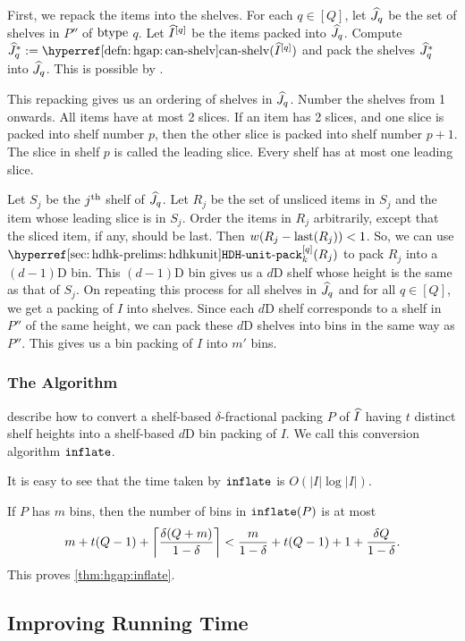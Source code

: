First, we repack the items into the shelves.
For each $q \in [Q]$, let $\widehat{J}_q$ be the set of shelves in $P''$ of $\operatorname{btype}$ $q$.
Let $\widehat{I}^{[q]}$ be the items packed into $\widehat{J}_q$.
Compute $\Jhat^*_q \defeq \canShelvHyp(\Ihat^{[q]})$ and pack the shelves
$\widehat{J}^*_q$ into $\widehat{J}_q$. This is possible by
.

This repacking gives us an ordering of shelves in $\widehat{J}_q$.
Number the shelves from 1 onwards.
All items have at most 2 slices. If an item has 2 slices, and one slice is packed
into shelf number $p$, then the other slice is packed into shelf number $p+1$.
The slice in shelf $p$ is called the leading slice.
Every shelf has at most one leading slice.

Let $S_j$ be the $j^{\textrm{th}}$ shelf of $\widehat{J}_q$.
Let $R_j$ be the set of unsliced items in $S_j$
and the item whose leading slice is in $S_j$.
Order the items in $R_j$ arbitrarily, except that the sliced item, if any, should be last.
Then $w(R_j - \operatorname{last}(R_j)) < 1$.
So, we can use $\hdhkunitHyp^{[q]}(R_j)$ to pack $R_j$ into a $(d-1)$D bin.
This $(d-1)$D bin gives us a $d$D shelf whose height is the same as that of $S_j$.
On repeating this process for all shelves in $\widehat{J}_q$ and for all $q \in [Q]$,
we get a packing of $I$ into shelves.
Since each $d$D shelf corresponds to a shelf in $P''$ of the same height,
we can pack these $d$D shelves into bins in the same way as $P''$.
This gives us a bin packing of $I$ into $m'$ bins.

\subsubsection{The Algorithm}

describe how to convert a shelf-based $\delta$-fractional packing $P$
of $\widehat{I}$ having $t$ distinct shelf heights into a shelf-based $d$D bin packing of $I$.
We call this conversion algorithm $\operatorname{\mathtt{inflate}}$.

It is easy to see that the time taken by $\operatorname{\mathtt{inflate}}$ is $O(|I|\log|I|)$.

If $P$ has $m$ bins, then the number of bins in $\operatorname{\mathtt{inflate}}(P)$ is at most
\[ m + t(Q-1) + \left\lceil \frac{\delta(Q+m)}{1-\delta} \right\rceil
< \frac{m}{1-\delta} + t(Q-1) + 1 + \frac{\delta Q}{1-\delta}. \]
This proves \cref{thm:hgap:inflate}.

\subsection{Improving Running Time}
\label{sec:hgap:improve-time}

